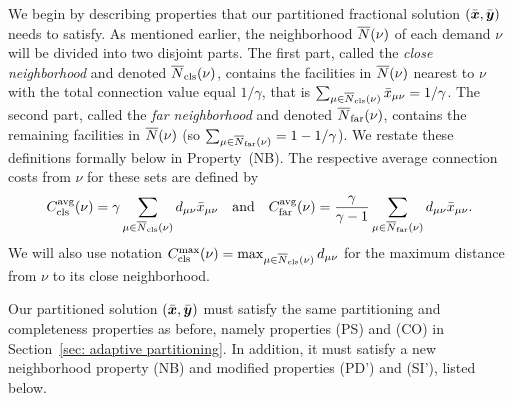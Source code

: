 We begin by describing properties that our partitioned fractional
solution $(\bar{\boldsymbol{x}},\bar{\boldsymbol{y}})$ needs to satisfy. As mentioned earlier, the neighborhood
${\overline{N}}(\nu)$ of each demand $\nu$ will be divided into two disjoint
parts.  The first part, called the \emph{close neighborhood} and denoted
${\overline{N}}_{\text{cls}}(\nu)$, contains the facilities in ${\overline{N}}(\nu)$ nearest to
$\nu$ with the total connection value equal $1/\gamma$, that is
$\sum_{\mu\in{\overline{N}}_{\text{cls}}(\nu)} {\bar x}_{\mu\nu} = 1/\gamma$.
The second
part, called the \emph{far neighborhood} and denoted ${\overline{N}}_{\text{far}}(\nu)$, contains
the remaining facilities in ${\overline{N}}(\nu)$ (so $\sum_{\mu\in{\overline{N}}_{\text{far}}(\nu)} = 1-1/\gamma$).
We restate these definitions formally
below in Property~(NB).  The respective average
connection costs from $\nu$ for these sets are defined by
%
\begin{equation*}
C_{\text{cls}}^{{\mbox{\scriptsize\rm avg}}}(\nu)=\gamma\sum_{\mu\in{\overline{N}}_{\text{cls}}(\nu)}
			d_{\mu\nu}{\bar x}_{\mu\nu} \quad\text{and}\quad
C_{\text{far}}^{{\mbox{\scriptsize\rm avg}}}(\nu)=\frac{\gamma}{\gamma-1}\sum_{\mu\in{\overline{N}}_{\text{far}}(\nu)}
d_{\mu\nu}{\bar x}_{\mu\nu}. 
\end{equation*}
%
We will also use
notation $C_{\text{cls}}^{\max}(\nu)=\max_{\mu\in{\overline{N}}_{\text{cls}}(\nu)} d_{\mu\nu}$ for
the maximum distance from $\nu$ to its close neighborhood.

Our partitioned solution $(\bar{\boldsymbol{x}},\bar{\boldsymbol{y}})$ must satisfy the same
partitioning and completeness properties as before, namely properties
(PS) and (CO) in Section~\ref{sec: adaptive partitioning}.  In
addition, it must satisfy a new neighborhood property (NB) and modified
properties (PD') and (SI'), listed below.

